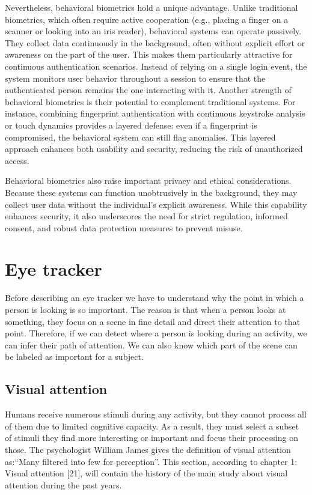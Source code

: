 \documentclass{article}
\begin{document}
Nevertheless, behavioral biometrics hold a unique advantage. 
Unlike traditional biometrics, which often require active cooperation (e.g., placing a finger on a scanner or looking into an iris reader), behavioral systems can operate passively. 
They collect data continuously in the background, often without explicit effort or awareness on the part of the user. 
This makes them particularly attractive for continuous authentication scenarios. 
Instead of relying on a single login event, the system monitors user behavior throughout a session to ensure that the authenticated person remains the one interacting with it.
Another strength of behavioral biometrics is their potential to complement traditional systems. 
For instance, combining fingerprint authentication with continuous keystroke analysis or touch dynamics provides a layered defense: even if a fingerprint is compromised, the behavioral system can still flag anomalies. 
This layered approach enhances both usability and security, reducing the risk of unauthorized access.

Behavioral biometrics also raise important privacy and ethical considerations. 
Because these systems can function unobtrusively in the background, they may collect user data without the individual's explicit awareness. 
While this capability enhances security, it also underscores the need for strict regulation, informed consent, and robust data protection measures to prevent misuse.

\newpage

\section{Eye tracker}

Before describing an eye tracker we have to understand why the point in which a person is looking is so important.
The reason is that when a person looks at something, they focus on a scene in fine detail and direct their attention to that point.
Therefore, if we can detect where a person is looking during an activity, we can infer their path of attention.
We can also know which part of the scene can be labeled as important for a subject.

\subsection{Visual attention}
Humans receive numerous stimuli during any activity, but they cannot process all of them due to limited cognitive capacity.
As a result, they must select a subset of stimuli they find more interesting or important and focus their processing on those.
The psychologist William James gives the definition of visual attention as:“Many filtered into few for perception”.
This section, according to chapter 1: Visual attention [21], will contain the history of the main study about visual attention during the past years.
\end{document}
